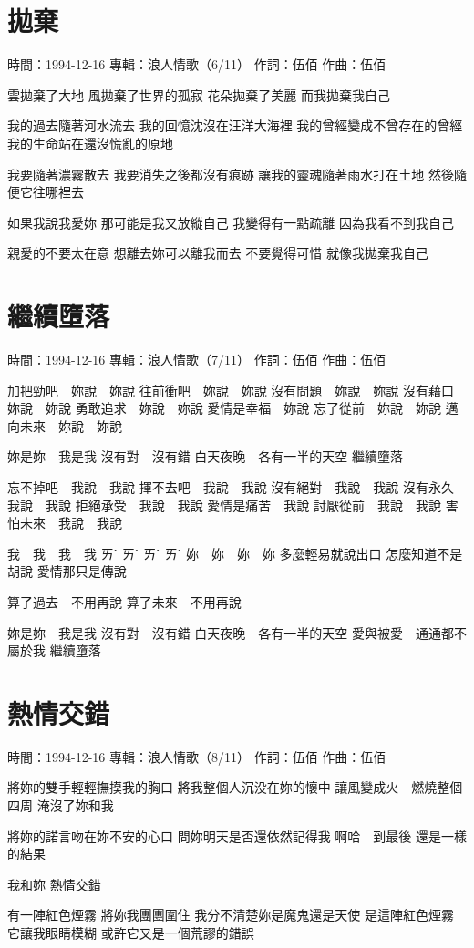 \documentclass[UTF8,a4paper,oneside,twocolumn,12pt]{ctexbook}
\newcommand{\infopair}[2]{\textbullet #1：#2}
\newcommand{\zc}[1][伍佰]{\infopair{作詞}{#1}}
\newcommand{\zq}[1][伍佰]{\infopair{作曲}{#1}}
\newcommand{\zj}[1]{\infopair{專輯}{#1}}
\newcommand{\sj}[1]{\infopair{時間}{#1}}
\newenvironment{info}{\begin{flushleft}\kaishu
	}
	{\end{flushleft}\normalsize\yahei\par}
\newenvironment{lyric}{
	}
{}
\begin{document}
\section{拋棄}
\begin{info}
	\sj{1994-12-16}
	\zj{浪人情歌（6/11）}
	\zc
	\zq
\end{info}
\begin{lyric}
	雲拋棄了大地
	風拋棄了世界的孤寂
	花朵拋棄了美麗
	而我拋棄我自己

	我的過去隨著河水流去
	我的回憶沈沒在汪洋大海裡
	我的曾經變成不曾存在的曾經
	我的生命站在還沒慌亂的原地

	我要隨著濃霧散去
	我要消失之後都沒有痕跡
	讓我的靈魂隨著雨水打在土地
	然後隨便它往哪裡去

	如果我說我愛妳
	那可能是我又放縱自己
	我變得有一點疏離
	因為我看不到我自己

	親愛的不要太在意
	想離去妳可以離我而去
	不要覺得可惜
	就像我拋棄我自己
\end{lyric}

\section{繼續墮落}
\begin{info}
	\sj{1994-12-16}
	\zj{浪人情歌（7/11）}
	\zc
	\zq
\end{info}
\begin{lyric}
	加把勁吧　妳說　妳說
	往前衝吧　妳說　妳說
	沒有問題　妳說　妳說
	沒有藉口　妳說　妳說
	勇敢追求　妳說　妳說
	愛情是幸福　妳說
	忘了從前　妳說　妳說
	邁向未來　妳說　妳說

	妳是妳　我是我
	沒有對　沒有錯
	白天夜晚　各有一半的天空
	繼續墮落

	忘不掉吧　我說　我說
	揮不去吧　我說　我說
	沒有絕對　我說　我說
	沒有永久　我說　我說
	拒絕承受　我說　我說
	愛情是痛苦　我說
	討厭從前　我說　我說
	害怕未來　我說　我說

	我　我　我　我
	ㄞˋ ㄞˋ ㄞˋ ㄞˋ
	妳　妳　妳　妳
	多麼輕易就說出口
	怎麼知道不是胡說
	愛情那只是傳說

	算了過去　不用再說
	算了未來　不用再說

	妳是妳　我是我
	沒有對　沒有錯
	白天夜晚　各有一半的天空
	愛與被愛　通通都不屬於我
	繼續墮落
\end{lyric}

\section{熱情交錯}
\begin{info}
	\sj{1994-12-16}
	\zj{浪人情歌（8/11）}
	\zc
	\zq
\end{info}
\begin{lyric}
	將妳的雙手輕輕撫摸我的胸口
	將我整個人沉没在妳的懷中
	讓風變成火　燃燒整個四周
	淹沒了妳和我

	將妳的諾言吻在妳不安的心口
	問妳明天是否還依然記得我
	啊哈　到最後
	還是一樣的結果

	我和妳
	熱情交錯

	有一陣紅色煙霧
	將妳我團團圍住
	我分不清楚妳是魔鬼還是天使
	是這陣紅色煙霧
	它讓我眼睛模糊
	或許它又是一個荒謬的錯誤
\end{lyric}
\end{document}
